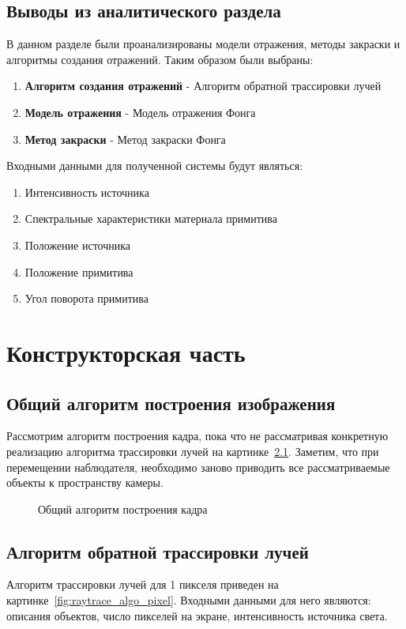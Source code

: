 \documentclass[a4paper,14pt,unknownkeysallowed]{extreport}
\begin{document}
\section{Выводы из аналитического раздела}
В данном разделе были проанализированы модели отражения, методы закраски и алгоритмы создания отражений.
Таким образом были выбраны:
\begin{enumerate}
	\item \textbf{Алгоритм создания отражений} - Алгоритм обратной трассировки лучей
	\item \textbf{Модель отражения} - Модель отражения Фонга
	\item \textbf{Метод закраски} - Метод закраски Фонга
\end{enumerate}


Входными данными для полученной системы будут являться:
\begin{enumerate}
	\item Интенсивность источника
	\item Спектральные характеристики материала примитива 
	\item Положение источника
	\item Положение примитива
	\item Угол поворота примитива
\end{enumerate}

\chapter{Конструкторская часть}


\section{Общий алгоритм построения изображения}
Рассмотрим алгоритм построения кадра, пока что не рассматривая конкретную реализацию алгоритма трассировки лучей на картинке~\ref{fig:frame_algo}.
Заметим, что при перемещении наблюдателя, необходимо заново приводить все рассматриваемые объекты к пространству камеры.

\begin{figure}[H]
	\centering
	
	\caption{Общий алгоритм построения кадра}
	\label{fig:frame_algo}
\end{figure}



\section{Алгоритм обратной трассировки лучей}
Алгоритм трассировки лучей для 1 пикселя приведен на картинке~\ref{fig:raytrace_algo_pixel}. Входными данными для него являются: описания объектов, число пикселей на экране,
интенсивность источника света.
\end{document}
